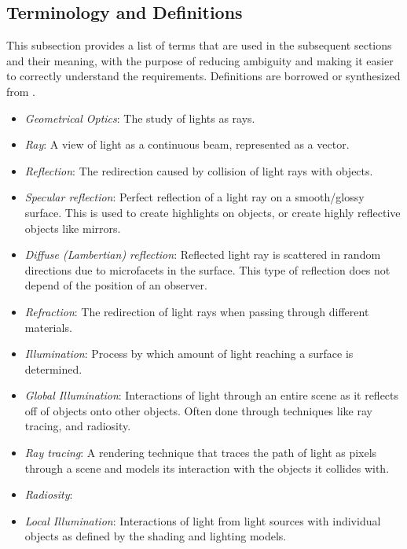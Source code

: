 \documentclass[12pt]{article}
\begin{document}
\subsection{Terminology and  Definitions}
This subsection provides a list of terms that are used in the subsequent
sections and their meaning, with the purpose of reducing ambiguity and making it
easier to correctly understand the requirements. Definitions are borrowed or 
synthesized from \cite{Lengyel2003,Comninos2005,shreiner2012}.

\begin{itemize}
\item[\label{}] \textit{Geometrical Optics}: The study of lights as rays.
\item[\label{}] \textit{Ray}: A view of light as a continuous beam, represented 
as a 
vector.
\item[\label{}] \textit{Reflection}: The redirection caused by collision of 
light rays 
with objects.
\item[\label{}] \textit{Specular reflection}: Perfect reflection of a light ray 
on a smooth/glossy surface. This is used to create highlights on objects, or 
create highly reflective objects like mirrors.
\item[\label{}] \textit{Diffuse (Lambertian) reflection}: Reflected light ray 
is scattered in random directions due to microfacets in the surface. This type 
of reflection does not depend of the position of an observer.
\item[\label{}] \textit{Refraction}: The redirection of light rays when passing 
through 
different materials.
\item[\label{}] \textit{Illumination}: Process by which amount of light 
reaching a 
surface is determined.
\item[\label{}] \textit{Global Illumination}: Interactions of light through an 
entire scene as it reflects off of objects onto other objects. Often done 
through techniques like ray tracing, and radiosity.
\item[\label{}] \textit{Ray tracing}: A rendering technique that traces the 
path of light as pixels through a scene and models its interaction with the 
objects it collides with.
\item[\label{}] \textit{Radiosity}: 
\item[\label{}] \textit{Local Illumination}: Interactions of light from light 
sources with individual objects as defined by the shading and lighting models.

\end{itemize}
\end{document}
